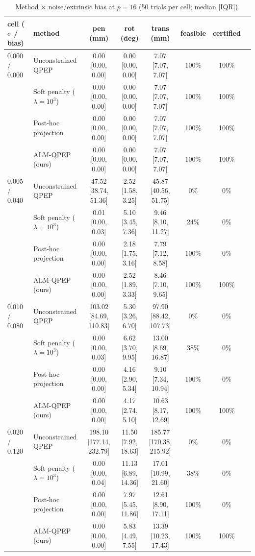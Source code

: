 \begin{table}[t]
\centering
\caption{Method $\times$ noise/extrinsic bias at $p=16$ (50 trials per cell; median [IQR]).}
\label{tab:app_noise}
\scriptsize
\setlength{\tabcolsep}{2pt}
\begin{tabular}{@{}llcccccc@{}}
\toprule
cell ($\sigma$ / bias) & method & pen (mm) & rot (deg) & trans (mm) & feasible & certified \\
\midrule
0.000 / 0.000 & Unconstrained QPEP & 0.00 [0.00, 0.00] & 0.00 [0.00, 0.00] & 7.07 [7.07, 7.07] & 100\% & 100\% \\
 & Soft penalty ($\lambda{=}10^3$) & 0.00 [0.00, 0.00] & 0.00 [0.00, 0.00] & 7.07 [7.07, 7.07] & 100\% & 100\% \\
 & Post-hoc projection & 0.00 [0.00, 0.00] & 0.00 [0.00, 0.00] & 7.07 [7.07, 7.07] & 100\% & 100\% \\
 & ALM-QPEP (ours) & 0.00 [0.00, 0.00] & 0.00 [0.00, 0.00] & 7.07 [7.07, 7.07] & 100\% & 100\% \\
\midrule
0.005 / 0.040 & Unconstrained QPEP & 47.52 [38.74, 51.36] & 2.52 [1.58, 3.25] & 45.87 [40.56, 51.75] & 0\% & 0\% \\
 & Soft penalty ($\lambda{=}10^3$) & 0.01 [0.00, 0.03] & 5.10 [3.45, 7.36] & 9.46 [8.10, 11.27] & 24\% & 0\% \\
 & Post-hoc projection & 0.00 [0.00, 0.00] & 2.18 [1.75, 3.16] & 7.79 [7.12, 8.58] & 100\% & 0\% \\
 & ALM-QPEP (ours) & 0.00 [0.00, 0.00] & 2.52 [1.89, 3.33] & 8.46 [7.10, 9.65] & 100\% & 100\% \\
\midrule
0.010 / 0.080 & Unconstrained QPEP & 103.02 [84.69, 110.83] & 5.30 [3.26, 6.70] & 97.90 [88.42, 107.73] & 0\% & 0\% \\
 & Soft penalty ($\lambda{=}10^3$) & 0.00 [0.00, 0.03] & 6.62 [3.70, 9.95] & 13.00 [8.69, 16.87] & 38\% & 0\% \\
 & Post-hoc projection & 0.00 [0.00, 0.00] & 4.16 [2.90, 5.34] & 9.10 [7.34, 10.94] & 100\% & 0\% \\
 & ALM-QPEP (ours) & 0.00 [0.00, 0.00] & 4.17 [2.74, 5.10] & 10.63 [8.17, 12.69] & 100\% & 100\% \\
\midrule
0.020 / 0.120 & Unconstrained QPEP & 198.10 [177.14, 232.79] & 11.50 [7.92, 18.63] & 185.77 [170.38, 215.92] & 0\% & 0\% \\
 & Soft penalty ($\lambda{=}10^3$) & 0.00 [0.00, 0.04] & 11.13 [6.89, 14.36] & 17.01 [10.99, 21.60] & 38\% & 0\% \\
 & Post-hoc projection & 0.00 [0.00, 0.00] & 7.97 [5.45, 11.86] & 12.61 [8.90, 17.11] & 100\% & 0\% \\
 & ALM-QPEP (ours) & 0.00 [0.00, 0.00] & 5.83 [4.49, 7.55] & 13.39 [10.23, 17.43] & 100\% & 100\% \\
\bottomrule
\end{tabular}

\end{table}

